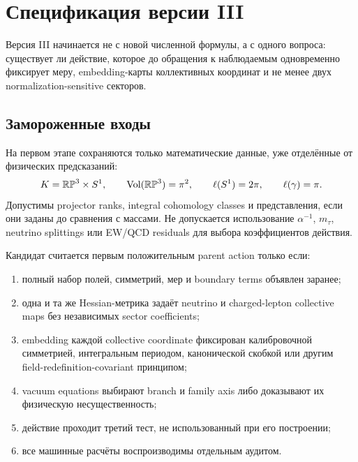 \chapter{Спецификация версии III}

Версия III начинается не с новой численной формулы, а с одного вопроса:
существует ли действие, которое до обращения к наблюдаемым одновременно
фиксирует меру, embedding-карты коллективных координат и не менее двух
normalization-sensitive секторов.

\section{Замороженные входы}

На первом этапе сохраняются только математические данные, уже отделённые от
физических предсказаний:
\begin{equation}
 K=\mathbb{RP}^3\times S^1,
 \qquad
 \operatorname{Vol}(\mathbb{RP}^3)=\pi^2,
 \qquad
 \ell(S^1)=2\pi,
 \qquad
 \ell(\gamma)=\pi.
\end{equation}
Допустимы projector ranks, integral cohomology classes и представления,
если они заданы до сравнения с массами. Не допускается использование
\(\alpha^{-1}\), \(m_\tau\), neutrino splittings или EW/QCD residuals для
выбора коэффициентов действия.

\begin{protocol}
Кандидат считается первым положительным parent action только если:
\begin{enumerate}
 \item полный набор полей, симметрий, мер и boundary terms объявлен заранее;
 \item одна и та же Hessian-метрика задаёт neutrino и charged-lepton
 collective maps без независимых sector coefficients;
 \item embedding каждой collective coordinate фиксирован калибровочной
 симметрией, интегральным периодом, канонической скобкой или другим
 field-redefinition-covariant принципом;
 \item vacuum equations выбирают branch и family axis либо доказывают их
 физическую несущественность;
 \item действие проходит третий тест, не использованный при его построении;
 \item все машинные расчёты воспроизводимы отдельным аудитом.
\end{enumerate}
\end{protocol}

